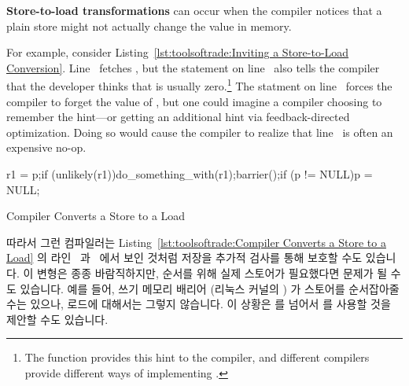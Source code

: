 {\bf Store-to-load transformations} can occur when the compiler notices
that a plain store might not actually change the value in memory.
\begin{fcvref}
For example, consider
Listing~\ref{lst:toolsoftrade:Inviting a Store-to-Load Conversion}.
Line~ fetches , but the  statement on
line~ also tells the compiler that the developer thinks that
 is usually zero.\footnote{
	The  function provides this hint to the compiler,
	and different compilers provide different ways of implementing
	.}
The  statment on line~ forces the compiler
to forget the value of , but one could imagine a compiler
choosing to remember the hint---or getting an additional hint via
feedback-directed optimization.
Doing so would cause the compiler to realize that line~
is often an expensive no-op.
\end{fcvref}

\fi

\begin{listing}[tbp]
\begin{fcvlabel}
\begin{VerbatimL}[commandchars=\\\[\]]
r1 = p;\lnlbl[load:p]
if (unlikely(r1))\lnlbl[if]
	do_something_with(r1);\lnlbl[dsw]
barrier();\lnlbl[barrier]
if (p != NULL)\lnlbl[if1]
	p = NULL;\lnlbl[null]
\end{VerbatimL}
\end{fcvlabel}
\caption{Compiler Converts a Store to a Load}
\label{lst:toolsoftrade:Compiler Converts a Store to a Load}
\end{listing}

\begin{fcvref}
따라서 그런 컴파일러는
Listing~\ref{lst:toolsoftrade:Compiler Converts a Store to a Load}
의 라인~ 과~ 에서 보인 것처럼  저장을 추가적
검사를 통해 보호할 수도 있습니다.
이 변형은 종종 바람직하지만, 순서를 위해 실제 스토어가 필요했다면 문제가 될
수도 있습니다.
예를 들어, 쓰기 메모리 배리어 (리눅스 커널의 ) 가 스토어를
순서잡아줄 수는 있으나, 로드에 대해서는 그렇지 않습니다.
이 상황은  를 넘어서  를 사용할 것을
제안할 수도 있습니다.
\end{fcvref}

